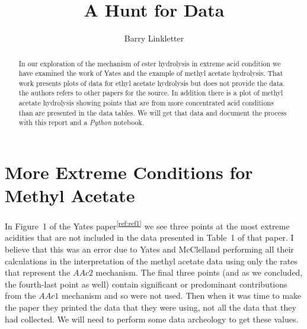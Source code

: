 \documentclass[]{tufte-handout}
\title{A Hunt for Data}
\author[Barry Linkletter]{Barry Linkletter}
\date{} %
\newcommand{\tss}[1]{\textsuperscript{#1}}
\begin{document}
\justifying

\maketitle
{}
\begin{abstract}

\noindent In our exploration of the mechanism of ester hydrolysis in extreme acid condition we have examined the work of Yates and the example of methyl acetate hydrolysis.
That work presents plots of data for ethyl acetate hydrolysis but does not provide the data. the authors refers to other papers for the source. In addition there is a plot of methyl acetate hydrolysis showing points that are from more concentrated acid conditions than are presented in the data tables. We will get that data and document the process with this report and a \textit{Python} notebook.

\end{abstract}




\section{More Extreme Conditions for Methyl Acetate}

In Figure~1 of the Yates paper\tss{\ref{ref:ref1}} we see three points at the most extreme acidities that are not included in the data presented in Table~1 of that paper. I believe that this was an error due to Yates and McClelland performing all their calculations in the interpretation of the methyl acetate data using only the rates that represent the $AAc2$ mechanism. The final three points (and as we concluded, the fourth-last point as well) contain significant or predominant contributions from the $AAc1$ mechanism and so were not used. Then when it was time to make the paper they printed the data that they were using, not all the data that they had collected. We will need to perform some data archeology to get these values.
\end{document}
